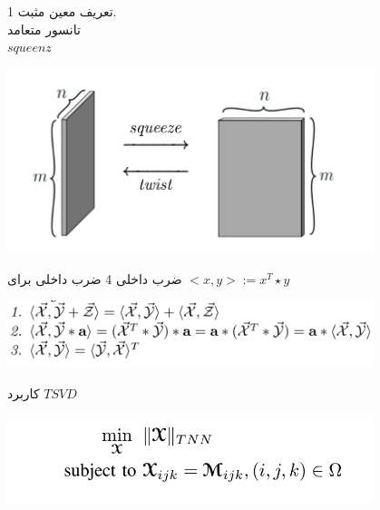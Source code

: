 \begin{frame}

	1 تعریف معین مثبت. 
	\\
	
	 تانسور متعامد\\
	
	 $squeenz$

\pause
\begin{center}
\includegraphics[width=0.8\textwidth]{img/sq.png}
\end{center}
\end{frame}
\begin{frame}{ضرب داخلی}
4 ضرب داخلی برای
$<x,y>:=x^T\star y$

\pause
\begin{center}
	\includegraphics[width=0.8\textwidth]{img/in.png}
\end{center}
\end{frame}
\begin{frame}{کاربرد $TSVD$}
\begin{center}
\includegraphics[width=0.8\textwidth]{img/tnn.png}
\end{center}
\end{frame}